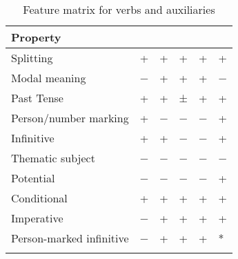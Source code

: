 \documentclass[output=paper]{langsci/langscibook}
\begin{document}
\begin{table}[htpb]
{\begin{tabularx}{\textwidth}{lXXXXX}
\textbf{Property}                &                               &                    &                             &                            &                                   \\
\midrule
Splitting                        & +                             & +                  & +                           & +                          &                                   +\\
Modal meaning                    & −                             & +                  & +                           & +                          &                                   −\\
Past Tense                       & +                             & +                  & ±                           & +                          &                                   +\\
Person/number marking    & +                             & −                  & −                           & −                          &                                   +\\
Infinitive                       & +                             & +                  & −                           & −                          &                                   +\\
Thematic subject                 & −                             & −                  & −                           & −                          &                                   −\\
Potential                        & −                             & −                  & −                           & −                          &                                   +\\
Conditional                      & +                             & +                  & +                           & +                          &                                   +\\
Imperative                       & −                             & +                  & +                           & +                          &                                   +\\
Person-marked infinitive & −                             & +                  & +                           & +                          &                                   *\\
\lspbottomrule
\end{tabularx}
}
\caption{Feature matrix for  verbs and auxiliaries}\label{tab:key:27.3}
\end{table}
\end{document}

